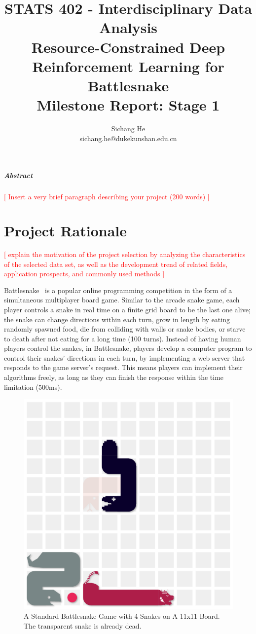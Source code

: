 \documentclass[a4paper]{article}
\title{STATS 402 - Interdisciplinary Data Analysis\\
    Resource-Constrained Deep Reinforcement Learning for Battlesnake\\
    Milestone Report: Stage 1
}
\author{Sichang He\\
    sichang.he@dukekunshan.edu.cn
}
\newcommand{\todo}[1]{\textcolor{red}{[ #1 ]}}
\begin{document}
\maketitle

\subparagraph{Abstract}

\todo{Insert a very brief paragraph describing your project (200 words)}

\section{Project Rationale}

\todo{explain the motivation of the project
    selection by analyzing the characteristics of the selected data set,
    as well as the development trend of related fields, application prospects,
    and commonly used methods}

Battlesnake~\cite{battlesnake}
is a popular online programming competition in the form of a simultaneous
multiplayer board game. Similar to the arcade snake game,
each player controls a snake in real time on a finite grid board to be the last
one alive; the snake can change directions within each turn,
grow in length by eating randomly spawned food,
die from colliding with walls or snake bodies,
or starve to death after not eating for a long time (100 turns).
Instead of having human players control the snakes, in Battlesnake,
players develop a computer program to control their snakes' directions in each
turn, by implementing a web server that responds to the game server's request.
This means players can implement their algorithms freely,
as long as they can finish the response within the time limitation (500ms).

\begin{figure}
    \centering
    \includegraphics[width=0.4\linewidth]{snake_game_screenshot.png}
    \caption{A Standard Battlesnake Game with 4 Snakes on A 11x11 Board.
        The transparent snake is already dead.
    }
    \label{fig:game}
\end{figure}
\end{document}
